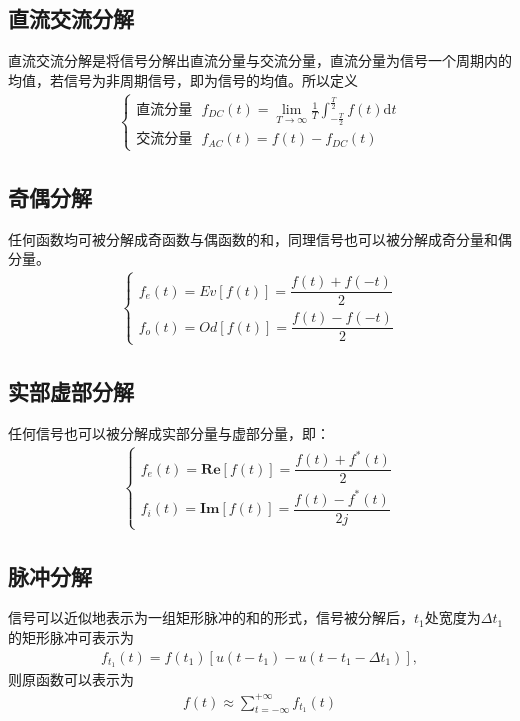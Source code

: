 \documentclass{hitreport}
\begin{document}
\subsection{直流交流分解}
直流交流分解是将信号分解出直流分量与交流分量，直流分量为信号一个周期内的均值，若信号为非周期信号，即为信号的均值。所以定义
\begin{align}
\left\{ \begin{array}{l}
	\text{直流分量}\ \ \ f_{DC}\left(t\right) = \underset{T\rightarrow \infty}{\lim}\frac{1}{T}\int_{-\frac{T}{2}}^{\frac{T}{2}}{f\left( t \right) \mathrm{d}t}\\
	\text{交流分量}\ \ \ f_{AC}\left(t\right) = f\left(t\right) - f_{DC}\left(t\right)
	\end{array} \right.
\end{align}

\subsection{奇偶分解}
任何函数均可被分解成奇函数与偶函数的和，同理信号也可以被分解成奇分量和偶分量。
\begin{align}
\left\{ \begin{array}{l}
	f_{e}\left(t\right) = Ev\left[f\left(t\right)\right] = \dfrac{f\left(t\right)+f\left(-t\right)}{2}\\
	f_{o}\left(t\right) = Od\left[f\left(t\right)\right] = \dfrac{f\left(t\right)-f\left(-t\right)}{2}
	\end{array} \right.
\end{align}

\subsection{实部虚部分解}
任何信号也可以被分解成实部分量与虚部分量，即：
\begin{align}
\left\{ \begin{array}{l}
	f_{e}\left(t\right) = \textbf{Re}\left[f\left(t\right)\right] = \dfrac{f\left(t\right)+f^{*}\left(t\right)}{2}\\
	f_{i}\left(t\right) = \textbf{Im}\left[f\left(t\right)\right] = \dfrac{f\left(t\right)-f^{*}\left(t\right)}{2j}
	\end{array} \right.
\end{align}

\subsection{脉冲分解}
信号可以近似地表示为一组矩形脉冲的和的形式，信号被分解后，$t_1$处宽度为$\Delta t_1$的矩形脉冲可表示为
\begin{align}
f_{t_1}\left(t\right) = f\left(t_1\right)\left[u\left(t-t_1\right)-u\left(t-t_1-\Delta t_1\right)\right],
\end{align}
则原函数可以表示为
\begin{align}
f\left(t\right) \approx \sum_{t=-\infty}^{+\infty}{f_{t_1}\left(t\right)}
\end{align}
\end{document}
